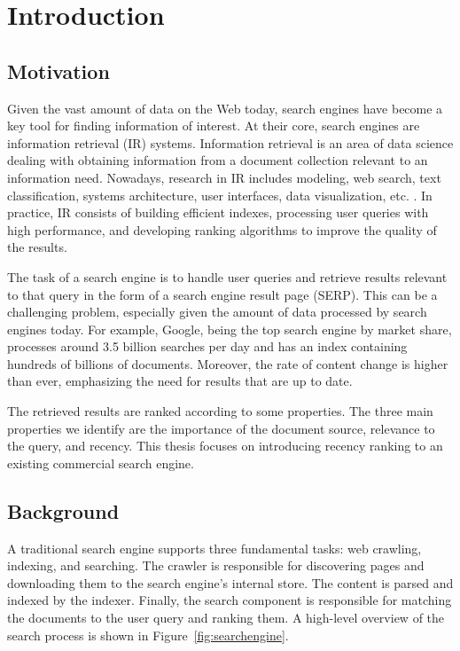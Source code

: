 \chapter{Introduction}
\label{ch:intro}

\section{Motivation}

Given the vast amount of data on the Web today, search engines have become a key tool for finding information of interest. At their core, search engines are information retrieval (IR) systems. Information retrieval is an area of data science dealing with obtaining information from a document collection relevant to an information need. Nowadays, research in IR includes modeling, web search, text classification, systems architecture, user interfaces, data visualization, etc. \citep{baeza1999modern}. In practice, IR consists of building efficient indexes, processing user queries with high performance, and developing ranking algorithms to improve the quality of the results.

The task of a search engine is to handle user queries and retrieve results relevant to that query in the form of a search engine result page (SERP). This can be a challenging problem, especially given the amount of data processed by search engines today. For example, Google, being the top search engine by market share, processes around 3.5 billion searches per day and has an index containing hundreds of billions of documents. Moreover, the rate of content change is higher than ever, emphasizing the need for results that are up to date.

The retrieved results are ranked according to some properties. The three main properties we identify are the importance of the document source, relevance to the query, and recency. This thesis focuses on introducing recency ranking to an existing commercial search engine.

\section{Background}

A traditional search engine supports three fundamental tasks: web crawling, indexing, and searching. The crawler is responsible for discovering pages and downloading them to the search engine's internal store. The content is parsed and indexed by the indexer. Finally, the search component is responsible for matching the documents to the user query and ranking them. A high-level overview of the search process is shown in Figure~\ref{fig:searchengine}.


